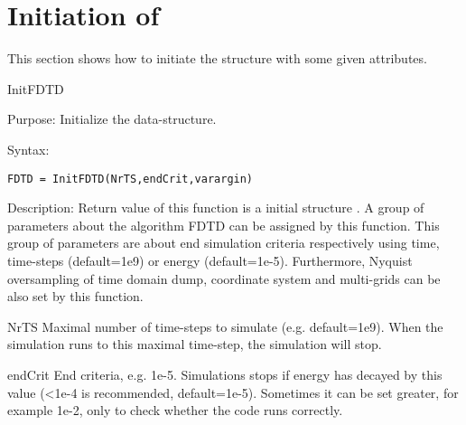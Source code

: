 \section{Initiation of } \label{sec:FDTD_ATTRIBUTE}
 \label{para:FDTD_ATTRIBUTE}
This section shows how to initiate the structure  with some given attributes.

\begin{FontNameFunct}{InitFDTD}
 \label{func:InitFDTD} 
\end{FontNameFunct}

\begin{FontDescr}{Purpose:}
Initialize the  data-structure.
\end{FontDescr}

\begin{FontDescr}{Syntax:}
      \begin{lstlisting}
FDTD = InitFDTD(NrTS,endCrit,varargin)
      \end{lstlisting}
\end{FontDescr}

\begin{FontDescr}{Description:}
Return value of this function is a initial structure  . A group of parameters about the algorithm FDTD can be assigned by this function. This group of parameters are about end  simulation criteria respectively  using time, time-steps (default=1e9) or energy (default=1e-5). Furthermore, Nyquist oversampling of time domain dump, coordinate system and multi-grids \cite{EC_FDTD_CYL_THORSTEN} can be also set by this function.
    \begin{FontPara}{NrTS}  \label{para:NrTS}
    Maximal number of time-steps to simulate (e.g. default=1e9). When the simulation runs to this maximal time-step, the simulation will stop.
    \end{FontPara}
    \begin{FontPara}{endCrit}  \label{para:endCrit}
    End criteria, e.g. 1e-5. Simulations stops if energy has decayed by this value (<1e-4 is recommended, default=1e-5). Sometimes it can be set greater, for example 1e-2, only to check whether the code runs correctly.
    \end{FontPara}
\end{FontDescr}

